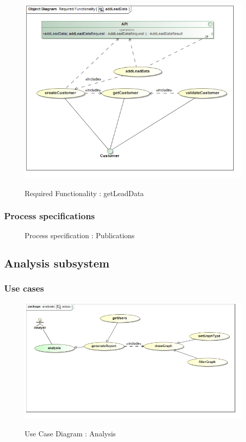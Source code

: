 \documentclass{article}
\begin{document}
		\begin{figure}[H]
		\includegraphics[width=\textwidth]{images/obj__Required_Functionality__addLeadData.jpg}  \\
		\caption{Required Functionality : getLeadData}
		\end{figure}

		\subsubsection{Process specifications}

		\begin{figure}[H]
		\caption{Process specification : Publications}
		\end{figure}

	\subsection{Analysis subsystem}
		\subsubsection{Use cases}

		\begin{figure}[H]
		\includegraphics[width=\textwidth]{images/uc__analysis__scope.jpg}  \\
		\caption{Use Case Diagram : Analysis}
		\end{figure}
\end{document}
